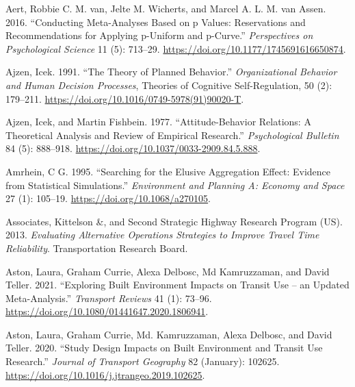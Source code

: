 \documentclass[
  11pt,
  openany]{memoir}
\newlength{\cslhangindent}
\newlength{\cslentryspacingunit} %
\newenvironment{CSLReferences}[2] %
 {%
  \setlength{\parindent}{0pt}
  \ifodd #1
  \let\oldpar\par
  \def\par{\hangindent=\cslhangindent\oldpar}
  \fi
  \setlength{\parskip}{#2\cslentryspacingunit}
 }%
 {}
\begin{document}
\hypertarget{refs}{}
\begin{CSLReferences}{1}{0}
\leavevmode{}%
Aert, Robbie C. M. van, Jelte M. Wicherts, and Marcel A. L. M. van Assen. 2016. {``Conducting {Meta}-{Analyses Based} on p {Values}: Reservations and {Recommendations} for {Applying} p-{Uniform} and p-{Curve}.''} \emph{Perspectives on Psychological Science} 11 (5): 713--29. \url{https://doi.org/10.1177/1745691616650874}.

\leavevmode{}%
Ajzen, Icek. 1991. {``The Theory of Planned Behavior.''} \emph{Organizational Behavior and Human Decision Processes}, Theories of {Cognitive Self}-{Regulation}, 50 (2): 179--211. \url{https://doi.org/10.1016/0749-5978(91)90020-T}.

\leavevmode{}%
Ajzen, Icek, and Martin Fishbein. 1977. {``Attitude-Behavior Relations: A Theoretical Analysis and Review of Empirical Research.''} \emph{Psychological Bulletin} 84 (5): 888--918. \url{https://doi.org/10.1037/0033-2909.84.5.888}.

\leavevmode{}%
Amrhein, C G. 1995. {``Searching for the {Elusive Aggregation Effect}: Evidence from {Statistical Simulations}.''} \emph{Environment and Planning A: Economy and Space} 27 (1): 105--19. \url{https://doi.org/10.1068/a270105}.

\leavevmode{}%
Associates, Kittelson \&, and Second Strategic Highway Research Program (US). 2013. \emph{Evaluating Alternative Operations Strategies to Improve Travel Time Reliability}. Transportation Research Board.

\leavevmode{}%
Aston, Laura, Graham Currie, Alexa Delbosc, Md Kamruzzaman, and David Teller. 2021. {``Exploring Built Environment Impacts on Transit Use -- an Updated Meta-Analysis.''} \emph{Transport Reviews} 41 (1): 73--96. \url{https://doi.org/10.1080/01441647.2020.1806941}.

\leavevmode{}%
Aston, Laura, Graham Currie, Md. Kamruzzaman, Alexa Delbosc, and David Teller. 2020. {``Study Design Impacts on Built Environment and Transit Use Research.''} \emph{Journal of Transport Geography} 82 (January): 102625. \url{https://doi.org/10.1016/j.jtrangeo.2019.102625}.


\end{CSLReferences}
\end{document}
